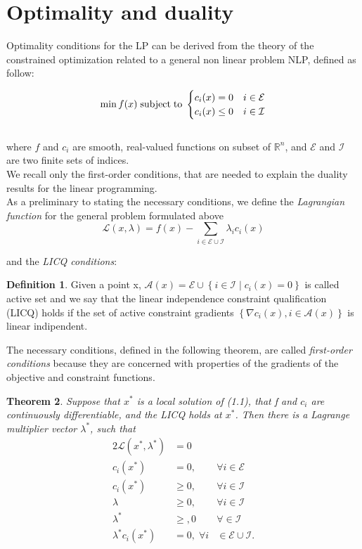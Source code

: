 \documentclass[a4paper,10 pt,titlepage,twoside]{book}
\theoremstyle{plain}
\newtheorem{thm}{Theorem}[chapter]
\theoremstyle{definition}
\newtheorem{defn}[thm]{Definition}
\theoremstyle{remark}
\begin{document}
\section{Optimality and duality}
Optimality conditions for the LP can be derived from the theory of the constrained optimization related to a general non linear problem NLP, defined as follow:

\begin{equation}
\min f(x)\text{\;subject\;to\;}\begin{cases} c_{i}(x) = 0 &i \in \mathcal{E}\\ c_{i}(x)\leq 0 &i\in \mathcal{I}\end{cases}
\end{equation}
\\
where $f$ and $c_{i}$ are smooth, real-valued functions on subset of $\mathbb{R}^{n}$, and $\mathcal{E}$ and $\mathcal{I}$ are two finite sets of indices.\\ We recall only the first-order conditions, that are needed to explain the duality results for the linear programming.\\
As a preliminary to stating the necessary conditions, we define the \textit{Lagrangian function} for the general problem formulated above 
\begin{equation*}
\mathcal{L}\left(x,\lambda\right)=f(x)-\sum_{i\in\mathcal{E}\cup\mathcal{I}}\lambda_{i}c_{i}(x)
\end{equation*}

and the \textit{LICQ conditions}:
\begin{defn}
	Given a point x, $\mathcal{A}(x)= \mathcal{E}\cup\left\lbrace i\in\mathcal{I}\;|\;c_{i}(x) =0\right\rbrace$ is called active set and we say that the linear independence constraint qualification (LICQ) holds if the set of active constraint gradients $\left\lbrace \nabla c_{i}(x),i\in\mathcal{A}(x)\right\rbrace$ is linear indipendent.
\end{defn}
The necessary conditions, defined in the following theorem, are called \textit{first-order conditions} because they are concerned with properties of the gradients of the objective and constraint functions.
\begin{thm}
Suppose that $x^{*}$ is a local solution of (1.1), that f and $c_{i}$ are continuously differentiable, and the LICQ holds at $x^{*}$. Then there is a Lagrange multiplier vector $\lambda^{*}$, such that 
\begin{alignat*}{2}
\mathcal{L}(x^{*},\lambda^{*})&=0&\\
c_{i}(x^{*})&=0, &\forall i\in\mathcal{E}\\
c_{i}(x^{*})&\geq 0, &\forall i\in\mathcal{I}\\
\lambda&\geq 0, &\forall i\in\mathcal{I}\\
\lambda^{*} &\geq, 0 & \forall \in\mathcal{I}\\
\lambda^{*}c_{i}(x^{*})&= 0,\;\forall i&\in\mathcal{E}\cup\mathcal{I}.\\
\end{alignat*} 
\end{thm}
\end{document}
